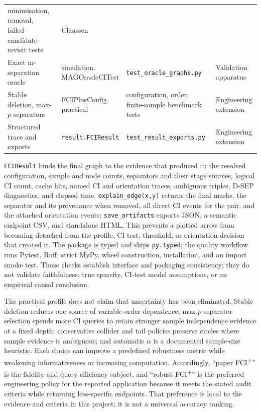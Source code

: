 \documentclass[11pt,a4paper]{article}
\newcommand{\FCIplus}{FCI\textsuperscript{+}}
\newcommand{\code}[1]{\texttt{#1}}
\begin{document}
\begin{table}[H]
\begin{tabularx}{\textwidth}{p{}p{}Yp{0.125\textwidth}}
minimisation, removal, failed-candidate revisit tests &
Claassen \\
Exact m-separation oracle &
\code{simulation.\newline MAGOracleCITest} &
\code{test\_oracle\_graphs.py} &
Validation apparatus \\
Stable deletion, max-\(p\) separators &
\code{FCIPlusConfig.\newline practical} &
configuration, order, finite-sample benchmark tests &
Engineering extension \\
Structured trace and exports &
\code{result.FCIResult} &
\code{test\_result\_exports.py} &
Engineering extension \\
\bottomrule
\end{tabularx}
\normalsize
\end{table}

\code{FCIResult} binds the final graph to the evidence that produced it: the
resolved configuration, sample and node counts, separators and their stage
sources, logical CI count, cache hits, named CI and orientation traces,
ambiguous triples, D-SEP diagnostics, and elapsed time.
\code{explain\_edge(x,y)} returns the final marks, the separator and its
provenance when removed, all direct CI events for the pair, and the attached
orientation events; \code{save\_artifacts} exports JSON, a semantic endpoint
CSV, and standalone HTML. This prevents a plotted arrow from becoming detached
from the profile, CI test, threshold, or orientation decision that created it.
The package is typed and ships \code{py.typed}; the quality workflow runs
Pytest, Ruff, strict MyPy, wheel construction, installation, and an import
smoke test. Those checks establish interface and packaging consistency; they do
not validate faithfulness, true sparsity, CI-test model assumptions, or an
empirical causal conclusion.

The practical profile does not claim that uncertainty has been eliminated.
Stable deletion reduces one source of variable-order dependence; max-\(p\)
separator selection spends more CI queries to retain stronger sample
independence evidence at a fixed depth; conservative collider and tail policies
preserve circles where sample evidence is ambiguous; and automatic \(\alpha\)
is a documented sample-size heuristic. Each choice can improve a predefined
robustness metric while weakening informativeness or increasing computation.
Accordingly, ``paper \FCIplus{}'' is the fidelity and query-efficiency subject,
and ``robust \FCIplus{}'' is the preferred engineering policy for the reported
application because it meets the stated audit criteria while returning
less-specific endpoints. That preference is local to the evidence and criteria
in this project; it is not a universal accuracy ranking.
\end{document}
